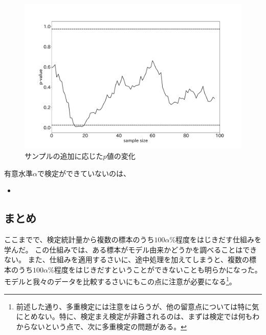 \begin{figure}
  \begin{center}
    \includegraphics[width=15cm]{./image/04_/recurssive_test.pdf}
    \caption{サンプルの追加に応じた$p$値の変化}
        \label{fig:time_series_p_value}
    \end{center}
\end{figure}





有意水準$\alpha$で検定ができていないのは、
\begin{itemize}
  \item 
\end{itemize}
\fi

\subsection{まとめ}
ここまでで、検定統計量から複数の標本のうち$100\alpha\%$程度をはじきだす仕組みを学んだ。
この仕組みでは、ある標本がモデル由来かどうかを調べることはできない。
また、仕組みを適用するさいに、途中処理を加えてしまうと、複数の標本のうち$100\alpha\%$程度をはじきだすということができないことも明らかになった。
モデルと我々のデータを比較するさいにもこの点に注意が必要になる\footnote{前述した通り、多重検定には注意をはらうが、他の留意点については特に気にとめない。特に、検定まえ検定が非難されるのは、まずは検定では何もわからないという点で、次に多重検定の問題がある。}。

